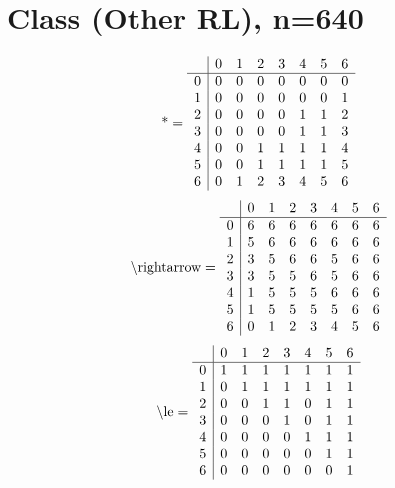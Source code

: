 \documentclass[11pt]{article}
\begin{document}
\section{Class (Other RL), n=640}
\[\text{*} = 
\begin{array}{r | r r r r r r r}
 & 0 & 1 & 2 & 3 & 4 & 5 & 6 \\ \hline
0 & 0 & 0 & 0 & 0 & 0 & 0 & 0 \\
1 & 0 & 0 & 0 & 0 & 0 & 0 & 1 \\
2 & 0 & 0 & 0 & 0 & 1 & 1 & 2 \\
3 & 0 & 0 & 0 & 0 & 1 & 1 & 3 \\
4 & 0 & 0 & 1 & 1 & 1 & 1 & 4 \\
5 & 0 & 0 & 1 & 1 & 1 & 1 & 5 \\
6 & 0 & 1 & 2 & 3 & 4 & 5 & 6 \\
\end{array}
\]
\[\text{\textbackslash rightarrow} = 
\begin{array}{r | r r r r r r r}
 & 0 & 1 & 2 & 3 & 4 & 5 & 6 \\ \hline
0 & 6 & 6 & 6 & 6 & 6 & 6 & 6 \\
1 & 5 & 6 & 6 & 6 & 6 & 6 & 6 \\
2 & 3 & 5 & 6 & 6 & 5 & 6 & 6 \\
3 & 3 & 5 & 5 & 6 & 5 & 6 & 6 \\
4 & 1 & 5 & 5 & 5 & 6 & 6 & 6 \\
5 & 1 & 5 & 5 & 5 & 5 & 6 & 6 \\
6 & 0 & 1 & 2 & 3 & 4 & 5 & 6 \\
\end{array}
\]
\[\text{\textbackslash le} = 
\begin{array}{r | r r r r r r r}
 & 0 & 1 & 2 & 3 & 4 & 5 & 6 \\ \hline
0 & 1 & 1 & 1 & 1 & 1 & 1 & 1 \\
1 & 0 & 1 & 1 & 1 & 1 & 1 & 1 \\
2 & 0 & 0 & 1 & 1 & 0 & 1 & 1 \\
3 & 0 & 0 & 0 & 1 & 0 & 1 & 1 \\
4 & 0 & 0 & 0 & 0 & 1 & 1 & 1 \\
5 & 0 & 0 & 0 & 0 & 0 & 1 & 1 \\
6 & 0 & 0 & 0 & 0 & 0 & 0 & 1 \\
\end{array}
\]
\end{document}

